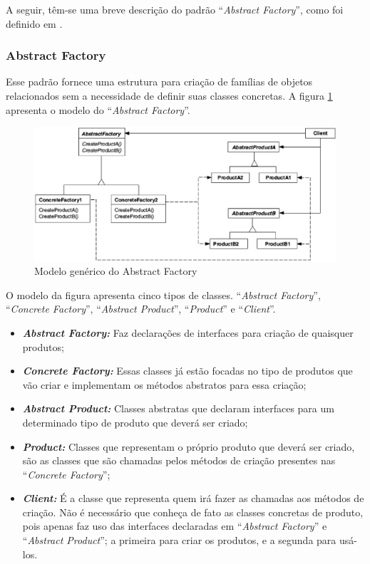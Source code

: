 A seguir, têm-se uma breve descrição do padrão ``\textit{Abstract Factory}'', como foi definido em \cite{Gamma:Helm:Johnson:Vlissides:1995}.

\subsubsection{Abstract Factory}

Esse padrão fornece uma estrutura para criação de famílias de objetos relacionados sem a necessidade de definir suas classes concretas. A figura \ref{abstract factory} apresenta o modelo do ``\textit{Abstract Factory}''.

\newpage

\begin{figure}[!h]
	\centering
	\includegraphics[scale=0.5]{figuras/capitulo2/abstract_factory.eps}
	\caption{Modelo genérico do Abstract Factory}
	\label{abstract factory}
\end{figure}

O modelo da figura apresenta cinco tipos de classes. ``\textit{Abstract Factory}'', ``\textit{Concrete Factory}'', ``\textit{Abstract Product}'', ``\textit{Product}'' e ``\textit{Client}''.

\begin{itemize}
	\item \textbf{\textit{Abstract Factory:}} Faz declarações de interfaces para criação de quaisquer produtos;
	\item \textbf{\textit{Concrete Factory:}} Essas classes já estão focadas no tipo de produtos que vão criar e implementam os métodos abstratos para essa criação;
	\item \textbf{\textit{Abstract Product:}} Classes abstratas que declaram interfaces para um determinado tipo de produto que deverá ser criado;
	\item \textbf{\textit{Product:}} Classes que representam o próprio produto que deverá ser criado, são as classes que são chamadas pelos métodos de criação presentes nas ``\textit{Concrete Factory}'';
	\item \textbf{\textit{Client:}} É a classe que representa quem irá fazer as chamadas aos métodos de criação. Não é necessário que conheça de fato as classes concretas de produto, pois apenas faz uso das interfaces declaradas em ``\textit{Abstract Factory}'' e ``\textit{Abstract Product}''; a primeira para criar os produtos, e a segunda para usá-los.
\end{itemize}

